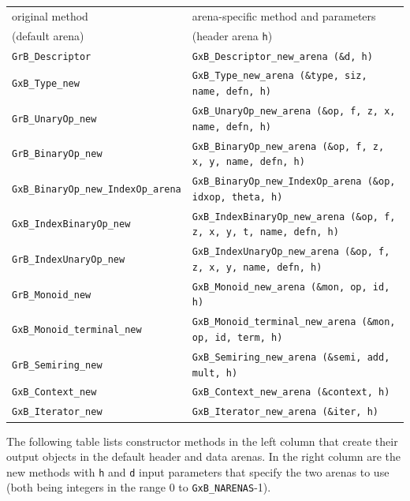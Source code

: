 \vspace{0.1in}
\noindent
\hspace{-0.5in}
{\footnotesize
\begin{tabular}{|ll|}
\hline
original method & arena-specific method and parameters \\
(default arena) & (header arena \verb'h') \\
\hline
\verb'GrB_Descriptor'           & \verb'GxB_Descriptor_new_arena (&d, h)' \\
\verb'GxB_Type_new'             & \verb'GxB_Type_new_arena (&type, siz, name, defn, h)' \\
\verb'GrB_UnaryOp_new'          & \verb'GxB_UnaryOp_new_arena (&op, f, z, x, name, defn, h)' \\
\verb'GrB_BinaryOp_new'         & \verb'GxB_BinaryOp_new_arena (&op, f, z, x, y, name, defn, h)' \\
\verb'GxB_BinaryOp_new_IndexOp_arena' & \verb'GxB_BinaryOp_new_IndexOp_arena (&op, idxop, theta, h)' \\
\verb'GxB_IndexBinaryOp_new'    & \verb'GxB_IndexBinaryOp_new_arena (&op, f, z, x, y, t, name, defn, h)' \\
\verb'GrB_IndexUnaryOp_new'     & \verb'GxB_IndexUnaryOp_new_arena (&op, f, z, x, y, name, defn, h)' \\
\verb'GrB_Monoid_new'           & \verb'GxB_Monoid_new_arena (&mon, op, id, h)' \\
\verb'GxB_Monoid_terminal_new'  & \verb'GxB_Monoid_terminal_new_arena (&mon, op, id, term, h)' \\
\verb'GrB_Semiring_new'         & \verb'GxB_Semiring_new_arena (&semi, add, mult, h)' \\
\verb'GxB_Context_new'          & \verb'GxB_Context_new_arena (&context, h)' \\
\verb'GxB_Iterator_new'         & \verb'GxB_Iterator_new_arena (&iter, h)' \\
\hline
\end{tabular}}
\vspace{0.05in}

The following table lists constructor methods in the left column that create
their output objects in the default header and data arenas.  In the right
column are the new methods with \verb'h' and \verb'd' input parameters that
specify the two arenas to use (both being integers in the range 0 to
\verb'GxB_NARENAS'-1).

